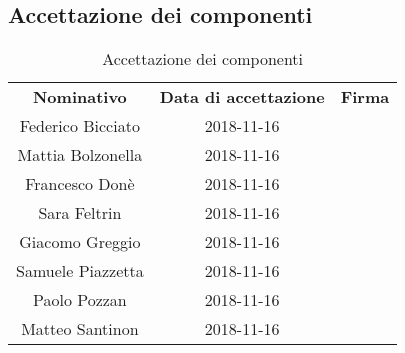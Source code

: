 \subsection{Accettazione dei componenti}
\begin{table}[H]
	\centering\renewcommand{\arraystretch}{1.5}
	\begin{tabular}{c|c|c}
		\hline
		
		\rowcolorhead 
		{ \textbf{Nominativo}} &
		{ \textbf{Data di accettazione}} &
		{ \textbf{Firma}}  \\
		
		\rowcolorlight
		Federico Bicciato & 2018-11-16 &   \\ \hline
		\rowcolordark
		Mattia Bolzonella & 2018-11-16 &   \\ \hline
		\rowcolorlight
		Francesco Donè & 2018-11-16 &   \\ \hline
		\rowcolordark
		Sara Feltrin & 2018-11-16 &   \\ \hline
		\rowcolorlight
		Giacomo Greggio & 2018-11-16 &   \\ \hline
		\rowcolordark
		Samuele Piazzetta & 2018-11-16 &   \\ \hline
		\rowcolorlight
		Paolo Pozzan & 2018-11-16 &   \\ \hline
		\rowcolordark
		Matteo Santinon & 2018-11-16 &   \\ \hline
	\end{tabular}
	\caption{Accettazione dei componenti}
\end{table}

